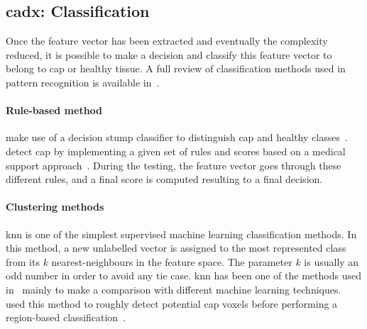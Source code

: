 \subsection{\acs*{cadx}: Classification} \label{subsec:chp3:img-clas:CADX-clas}


Once the feature vector has been extracted and eventually the complexity reduced, it is possible to make a decision and classify this feature vector to belong to \ac{cap} or healthy tissue.
A full review of classification methods used in pattern recognition is available in~\cite{Bishop2006}.

\paragraph{Rule-based method}
\citeauthor{Lv2009} make use of a decision stump classifier to distinguish \ac{cap} and healthy classes~\cite{Lv2009}. 
\citeauthor{Puech2009} detect \ac{cap} by implementing a given set of rules and scores based on a medical support approach~\cite{Puech2009}.
During the testing, the feature vector goes through these different rules, and a final score is computed resulting to a final decision.

\paragraph{Clustering methods}
\acf{knn} is one of the simplest supervised machine learning classification methods.
In this method, a new unlabelled vector is assigned to the most represented class from its $k$ nearest-neighbours in the feature space.
The parameter $k$ is usually an odd number in order to avoid any tie case.
\ac{knn} has been one of the methods used in~\cite{Niaf2011,Niaf2012,rampun2016computerb} mainly to make a comparison with different machine learning techniques.
\citeauthor{Litjens2012} used this method to roughly detect potential \ac{cap} voxels before performing a region-based classification~\cite{Litjens2012}.

